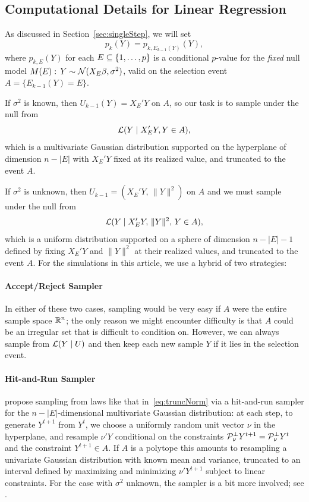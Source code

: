 \documentclass{article}
\begin{document}
\begin{appendix}
\section{Computational Details for Linear Regression}\label{sec:linRegComputation}

As discussed in Section~\ref{sec:singleStep}, we will set
\[
p_k(Y) = p_{k, E_{k-1}(Y)}(Y),
\]
where $p_{k,E}(Y)$ for each $E\subseteq \{1,\ldots, p\}$ is a conditional $p$-value for the {\em fixed} null model $M(E):\, Y \sim \mathcal{N}(X_E\beta, \sigma^2)$, valid on the selection event $A=\{E_{k-1}(Y)=E\}$.

If $\sigma^2$ is known, then $U_{k-1}(Y) = X_{E}'Y$ on $A$, so our task is to sample under the null from
\begin{equation}\label{eq:truncNorm}
\mathcal{L}(Y \mid X_E'Y, Y\in A),
\end{equation}
which is a multivariate Gaussian distribution supported on the hyperplane of dimension $n-|E|$ with $X_E'Y$ fixed at its realized value, and truncated to the event $A$. 

If $\sigma^2$ is unknown, then $U_{k-1}=(X_E'Y,\, \|Y\|^2)$ on $A$ and we must sample under the null from
\begin{equation}\label{eq:truncUnif}
\mathcal{L}(Y \mid X_E'Y,\, \|Y\|^2,\, Y\in A),
\end{equation}
which is a uniform distribution supported on a sphere of dimension $n-|E|-1$ defined by fixing $X_E'Y$ and $\|Y\|^2$ at their realized values, and truncated to the event $A$. For the simulations in this article, we use a hybrid of two strategies:

\paragraph{Accept/Reject Sampler} In either of these two cases, sampling would be very easy if $A$ were the entire sample space $\mathbb{R}^n$; the only reason we might encounter difficulty is that $A$ could be an irregular set that is difficult to condition on. However, we can always sample from $\mathcal{L}(Y \mid U)$ and then keep each new sample $Y$ if it lies in the selection event.

\paragraph{Hit-and-Run Sampler} \citet{fithian2014optimal} propose sampling from laws like that in~\eqref{eq:truncNorm} via a hit-and-run sampler for the $n-|E|$-dimensional multivariate Gaussian distribution: at each step, to generate $Y^{t+1}$ from $Y^t$, we choose a uniformly random unit vector $\nu$ in the hyperplane, and resample $\nu'Y$ conditional on the constraints $\mathcal{P}_{\nu}^\perp Y^{t+1}=\mathcal{P}_{\nu}^\perp Y^t$ and the constraint $Y^{t+1}\in A$. If $A$ is a polytope this amounts to resampling a univariate Gaussian distribution with known mean and variance, truncated to an interval defined by maximizing and minimizing $\nu'Y^{t+1}$ subject to linear constraints. For the case with $\sigma^2$ unknown, the sampler is a bit more involved; see \citet{fithian2014optimal}.


\end{appendix}
\end{document}
